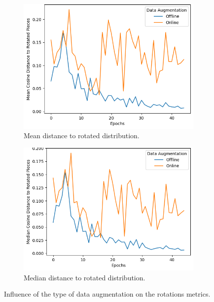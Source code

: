 \begin{figure}[]
    \begin{subfigure}[h]{0.5\linewidth}
        \includegraphics[width=\columnwidth]{images/mean_rotated_data_augmentation_type.png}
        \caption{Mean distance to rotated distribution.}
        \label{fig:mean_rotated_data_augmentation_type}
    \end{subfigure}
    \hfill
    \begin{subfigure}[h]{0.5\linewidth}
        \includegraphics[width=\columnwidth]{images/median_rotated_data_augmentation_type.png}
        \caption{Median distance to rotated distribution.}
        \label{fig:median_rotated_data_augmentation_type}
    \end{subfigure}
    \caption{Influence of the type of data augmentation on the rotations metrics.}
\end{figure}

